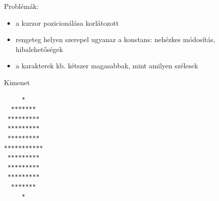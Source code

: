 \documentclass[usenames,dvipsnames,aspectratio=169]{beamer}
\begin{document}
\begin{frame}[fragile]
  Problémák:
  \begin{itemize}
    \item a kurzor pozicionálása korlátozott
    \item rengeteg helyen szerepel ugyanaz a konstans: nehézkes módosítás, hibalehetőségek
    \item a karakterek kb. kétszer magasabbak, mint amilyen szélesek
  \end{itemize}
  \begin{block}{Kimenet}
    \vspace{-.3cm}
    \scriptsize
    \begin{verbatim}
     *     
  *******  
 ********* 
 ********* 
 ********* 
***********
 ********* 
 ********* 
 ********* 
  *******  
     *
\end{verbatim}
\vspace{-.3cm}
  \end{block}
\end{frame}

\begin{frame}
  \begin{exampleblock}{}
    \vspace{-.2cm}
    \scriptsize
    
    \vspace{-.2cm}
  \end{exampleblock}
\end{frame}
\end{document}
